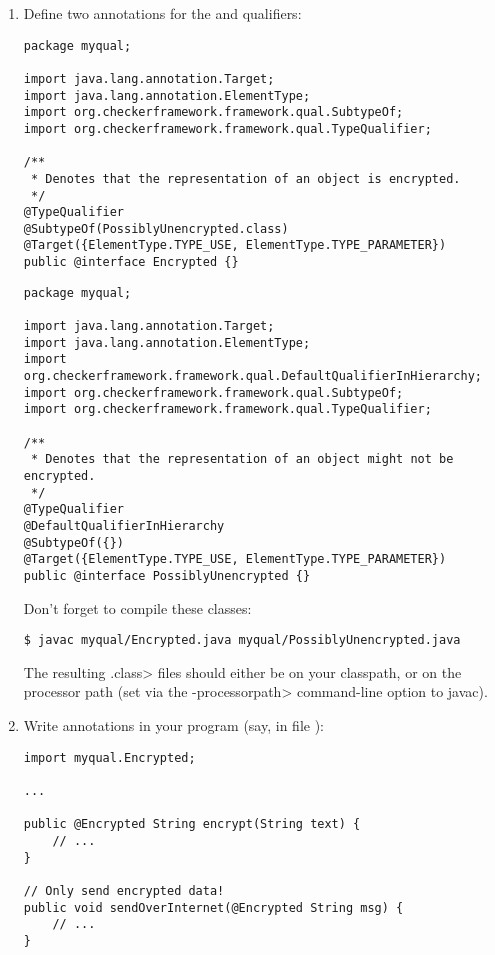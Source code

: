 \begin{enumerate}
\item
 Define two annotations for the  and  qualifiers:

\begin{Verbatim}
package myqual;

import java.lang.annotation.Target;
import java.lang.annotation.ElementType;
import org.checkerframework.framework.qual.SubtypeOf;
import org.checkerframework.framework.qual.TypeQualifier;

/**
 * Denotes that the representation of an object is encrypted.
 */
@TypeQualifier
@SubtypeOf(PossiblyUnencrypted.class)
@Target({ElementType.TYPE_USE, ElementType.TYPE_PARAMETER})
public @interface Encrypted {}
\end{Verbatim}

\begin{Verbatim}
package myqual;

import java.lang.annotation.Target;
import java.lang.annotation.ElementType;
import org.checkerframework.framework.qual.DefaultQualifierInHierarchy;
import org.checkerframework.framework.qual.SubtypeOf;
import org.checkerframework.framework.qual.TypeQualifier;

/**
 * Denotes that the representation of an object might not be encrypted.
 */
@TypeQualifier
@DefaultQualifierInHierarchy
@SubtypeOf({})
@Target({ElementType.TYPE_USE, ElementType.TYPE_PARAMETER})
public @interface PossiblyUnencrypted {}
\end{Verbatim}

Don't forget to compile these classes:

\begin{Verbatim}
$ javac myqual/Encrypted.java myqual/PossiblyUnencrypted.java
\end{Verbatim}

The resulting \<.class> files should either be on your classpath, or on the
processor path (set via the \<-processorpath> command-line option to javac).

\item
  Write  annotations in your program (say, in file
  ):

\begin{Verbatim}
import myqual.Encrypted;

...

public @Encrypted String encrypt(String text) {
    // ...
}

// Only send encrypted data!
public void sendOverInternet(@Encrypted String msg) {
    // ...
}


\end{Verbatim}
\end{enumerate}
